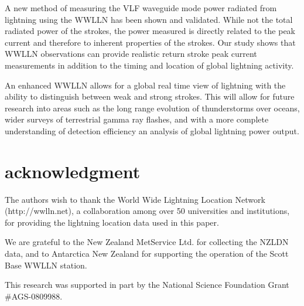 A new method of measuring the VLF waveguide mode power radiated from lightning using the WWLLN has been shown and validated.
While not the total radiated power of the strokes, the power measured is directly related to the peak current and therefore to inherent properties of the strokes.
Our study shows that WWLLN observations can provide realistic return stroke peak current measurements in addition to the timing and location of global lightning activity.

An enhanced WWLLN allows for a global real time view of lightning with the ability to distinguish between weak and strong strokes.
This will allow for future research into areas such as the long range evolution of thunderstorms over oceans, wider surveys of terrestrial gamma ray flashes, and with a more complete understanding of detection efficiency an analysis of global lightning power output.

\section{acknowledgment} 
The authors wish to thank the World Wide Lightning Location Network (http://wwlln.net), a collaboration among over 50 universities and institutions, for providing the lightning location data used in this paper.

We are grateful to the New Zealand MetService Ltd. for collecting the NZLDN data, and to Antarctica New Zealand for supporting the operation of the Scott Base WWLLN station.

This research was supported in part by the National Science Foundation Grant \#AGS-0809988.
